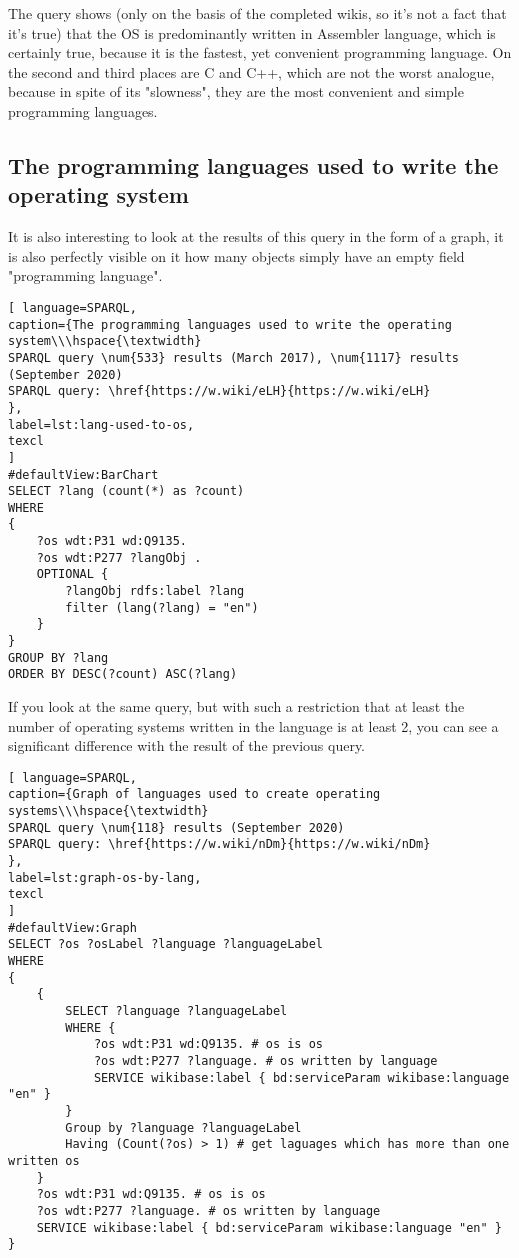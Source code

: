 The query shows (only on the basis of the completed wikis, so it's not a fact that it's true) that the OS is predominantly written in Assembler language, which is certainly true, because it is the fastest, yet convenient programming language. On the second and third places are C and C++, which are not the worst analogue, because in spite of its "slowness", they are the most convenient and simple programming languages.

\subsection{The programming languages used to write the operating system}

It is also interesting to look at the results of this query in the form of a graph, it is also perfectly visible on it how many objects simply have an empty field "programming language".

\begin{lstlisting}[ language=SPARQL, 
caption={The programming languages used to write the operating system\\\hspace{\textwidth}
SPARQL query \num{533} results (March 2017), \num{1117} results (September 2020)
SPARQL query: \href{https://w.wiki/eLH}{https://w.wiki/eLH}
},
label=lst:lang-used-to-os,
texcl 
]
#defaultView:BarChart
SELECT ?lang (count(*) as ?count)
WHERE 
{
	?os wdt:P31 wd:Q9135.
	?os wdt:P277 ?langObj .
	OPTIONAL {
		?langObj rdfs:label ?lang
		filter (lang(?lang) = "en")
	}
}
GROUP BY ?lang
ORDER BY DESC(?count) ASC(?lang)
\end{lstlisting}

If you look at the same query, but with such a restriction that at least the number of operating systems written in the language is at least 2, you can see a significant difference with the result of the previous query.


\begin{lstlisting}[ language=SPARQL, 
caption={Graph of languages used to create operating systems\\\hspace{\textwidth}
SPARQL query \num{118} results (September 2020)
SPARQL query: \href{https://w.wiki/nDm}{https://w.wiki/nDm}
},
label=lst:graph-os-by-lang,
texcl 
]
#defaultView:Graph
SELECT ?os ?osLabel ?language ?languageLabel
WHERE
{
	{
		SELECT ?language ?languageLabel
		WHERE {
			?os wdt:P31 wd:Q9135. # os is os
			?os wdt:P277 ?language. # os written by language
			SERVICE wikibase:label { bd:serviceParam wikibase:language "en" }
		} 
		Group by ?language ?languageLabel 
		Having (Count(?os) > 1) # get laguages which has more than one written os
	}
	?os wdt:P31 wd:Q9135. # os is os
	?os wdt:P277 ?language. # os written by language
	SERVICE wikibase:label { bd:serviceParam wikibase:language "en" }
}
\end{lstlisting}
